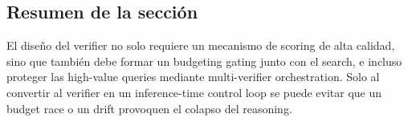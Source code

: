 \subsection{Resumen de la sección}
El diseño del verifier no solo requiere un mecanismo de scoring de alta calidad, sino que también debe formar un budgeting gating junto con el search, e incluso proteger las high-value queries mediante multi-verifier orchestration. Solo al convertir al verifier en un inference-time control loop se puede evitar que un budget race o un drift provoquen el colapso del reasoning.

